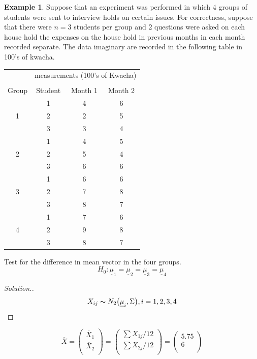 \documentclass[11pt,a4paper]{article}
\theoremstyle{definition}
\newtheorem{exa}[thm]{Example}
\newenvironment{solution}
  {\renewcommand{\qedsymbol}{}\begin{proof}[\textit{Solution}.]}
  {\end{proof}}
\begin{document}
\begin{exa}
Suppose that an experiment was performed in which 4 groups of students were sent to interview holds on certain issues. For correctness, suppose that there were $n=3$ students per group and 2 questions were asked on each house hold the expenses on the house hold in previous months in each month recorded separate. The data imaginary are recorded in the following table in 100's of kwacha.\\
\end{exa}


\begin{table}[H]
\centering
\begin{tabular}{cccc}
\hline
&\multicolumn{3}{c}{measurements (100's of Kwacha)}\\\\
Group & Student & Month 1 & Month 2\\
\hline
 & 1 & 4 & 6\\
1& 2 & 2 & 5\\
 & 3 & 3 & 4\\
\hline 
 & 1 & 4 & 5\\
2& 2 & 5 & 4\\
 & 3 & 6 & 6\\
\hline
 & 1 & 6 & 6\\
3& 2 & 7 & 8\\
 & 3 & 8 & 7\\
\hline 
 & 1 & 7 & 6\\
4& 2 & 9 & 8\\
 & 3 & 8 & 7\\
\hline
\end{tabular}
\end{table}


Test for the difference in mean vector in the four groups.$$H_0: \underline{\mu}_1 = \underline{\mu}_2=\underline{\mu}_3=\underline{\mu}_4$$
\begin{solution}
$$X_{ij} \thicksim N_2\big(\underline{\mu}_i,\Sigma\big),  i=1,2,3,4$$
\end{solution}

$$\overline{X}=\begin{pmatrix}
\overline{X}_1\\ \overline{X}_2\\
\end{pmatrix}=
\begin{pmatrix}
\sum X_{1j}/12\\ \sum X_{2j}/12\\
\end{pmatrix}=
\begin{pmatrix}
5.75\\ 6\\
\end{pmatrix}
$$\\
\end{document}
